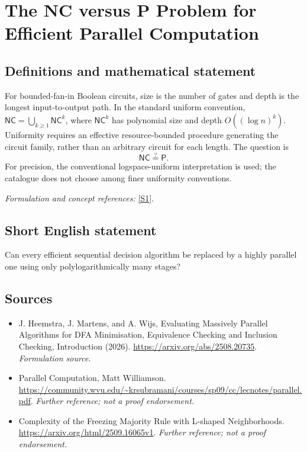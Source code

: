 \documentclass[11pt]{article}
\begin{document}
\section*{\texorpdfstring{The NC versus P Problem for Efficient Parallel Computation}{The NC versus P Problem for Efficient Parallel Computation}}\label{23}
\subsection{Definitions and mathematical statement}
For bounded-fan-in Boolean circuits, size is the number of gates and depth is the longest input-to-output path. In the standard uniform convention, $\mathsf{NC}=\bigcup_{k\ge1}\mathsf{NC}^k$, where $\mathsf{NC}^k$ has polynomial size and depth $O((\log n)^k)$. Uniformity requires an effective resource-bounded procedure generating the circuit family, rather than an arbitrary circuit for each length. The question is
\[
 \mathsf{NC}\stackrel{?}{=}\mathsf P.
\]
For precision, the conventional logspace-uniform interpretation is used; the catalogue does not choose among finer uniformity conventions.
\par\smallskip\textit{Formulation and concept references:} \href{https://arxiv.org/abs/2508.20735}{[S1]}.

\subsection{Short English statement}
Can every efficient sequential decision algorithm be replaced by a highly parallel one using only polylogarithmically many stages?
\subsection{Sources}
\begin{itemize}
\item[S1]J. Heemstra, J. Martens, and A. Wijs, Evaluating Massively Parallel Algorithms for DFA Minimisation, Equivalence Checking and Inclusion Checking, Introduction (2026).
\url{https://arxiv.org/abs/2508.20735}.
\textit{Formulation source.}
\item[S2]Parallel Computation, Matt Williamson.
\url{https://community.wvu.edu/~krsubramani/courses/sp09/cc/lecnotes/parallel.pdf}.
\textit{Further reference; not a proof endorsement.}
\item[S3]Complexity of the Freezing Majority Rule with L-shaped Neighborhoods.
\url{https://arxiv.org/html/2509.16065v1}.
\textit{Further reference; not a proof endorsement.}
\end{itemize}
\end{document}
